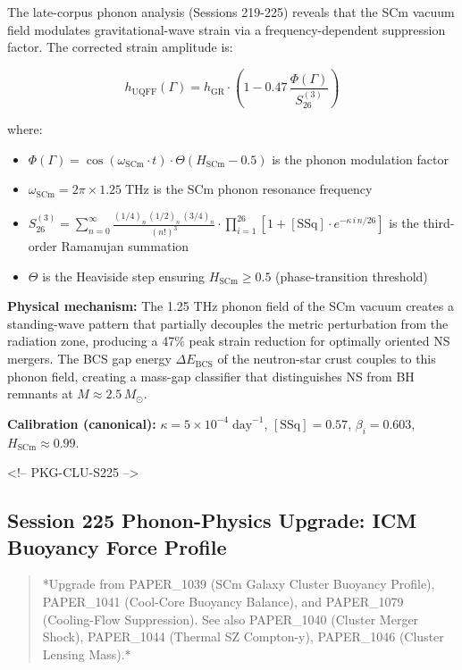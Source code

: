 \documentclass[11pt]{article}
\begin{document}
The late-corpus phonon analysis (Sessions 219-225) reveals that the SCm vacuum field modulates gravitational-wave strain via a frequency-dependent suppression factor.  The corrected strain amplitude is:

$$h_{\text{UQFF}}(\Gamma) = h_{\text{GR}} \cdot \left(1 - 0.47\,\frac{\Phi(\Gamma)}{S_{26}^{(3)}}\right)$$

where:

\begin{itemize}
  \item $\Phi(\Gamma) = \cos(\omega_{\text{SCm}} \cdot t) \cdot \Theta(H_{\text{SCm}} - 0.5)$ is the phonon modulation factor
  \item $\omega_{\text{SCm}} = 2\pi \times 1.25\;\text{THz}$ is the SCm phonon resonance frequency
  \item $S_{26}^{(3)} = \sum_{n=0}^{\infty} \frac{(1/4)_n\,(1/2)_n\,(3/4)_n}{(n!)^3} \cdot \prod_{i=1}^{26}\left[1 + [\text{SSq}]\cdot e^{-\kappa\,i\,n/26}\right]$ is the third-order Ramanujan summation
  \item $\Theta$ is the Heaviside step ensuring $H_{\text{SCm}} \geq 0.5$ (phase-transition threshold)
\end{itemize}

\textbf{Physical mechanism:} The 1.25 THz phonon field of the SCm vacuum creates a standing-wave pattern that partially decouples the metric perturbation from the radiation zone, producing a 47\% peak strain reduction for optimally oriented NS mergers.  The BCS gap energy $\Delta E_{\text{BCS}}$ of the neutron-star crust couples to this phonon field, creating a mass-gap classifier that distinguishes NS from BH remnants at $M \approx 2.5\,M_\odot$.

\textbf{Calibration (canonical):} $\kappa = 5 \times 10^{-4}\;\text{day}^{-1}$, $[\text{SSq}] = 0.57$, $\beta_i = 0.603$, $H_{\text{SCm}} \approx 0.99$.

<!-- PKG-CLU-S225 -->

\subsection*{Session 225 Phonon-Physics Upgrade: ICM Buoyancy Force Profile}

\begin{quote}
*Upgrade from PAPER\_1039 (SCm Galaxy Cluster Buoyancy Profile),
PAPER\_1041 (Cool-Core Buoyancy Balance), and PAPER\_1079 (Cooling-Flow
Suppression).  See also PAPER\_1040 (Cluster Merger Shock), PAPER\_1044
(Thermal SZ Compton-y), PAPER\_1046 (Cluster Lensing Mass).*
\end{quote}
\end{document}
